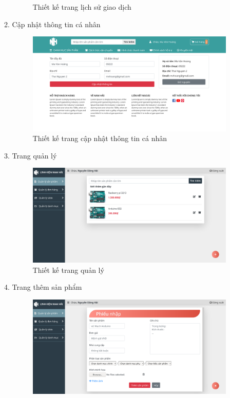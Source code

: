 \begin{enumerate}[label=\textbf{\alph*)}]
\begin{enumerate}[label=\textbf{\alph*)}]
\begin{figure}[h!]
       \caption{Thiết kế trang lịch sử giao dịch}
    \end{figure}
    \item Cập nhật thông tin cá nhân
    \begin{figure}[h!]
       \centering
        \includegraphics[width=\linewidth]{fig/r_user2.png}
       \caption{Thiết kế trang cập nhật thông tin cá nhân}
    \end{figure}
    \newpage
    \item Trang quản lý
    \begin{figure}[h!]
       \centering
        \includegraphics[width=\linewidth]{fig/r_manage_product.png}
       \caption{Thiết kế trang quản lý}
    \end{figure}
    \item Trang thêm sản phẩm
    \begin{figure}[h!]
       \centering
        \includegraphics[width=\linewidth]{fig/r_manage_product_add_product.png}

\end{figure}
\end{enumerate}
\end{enumerate}
